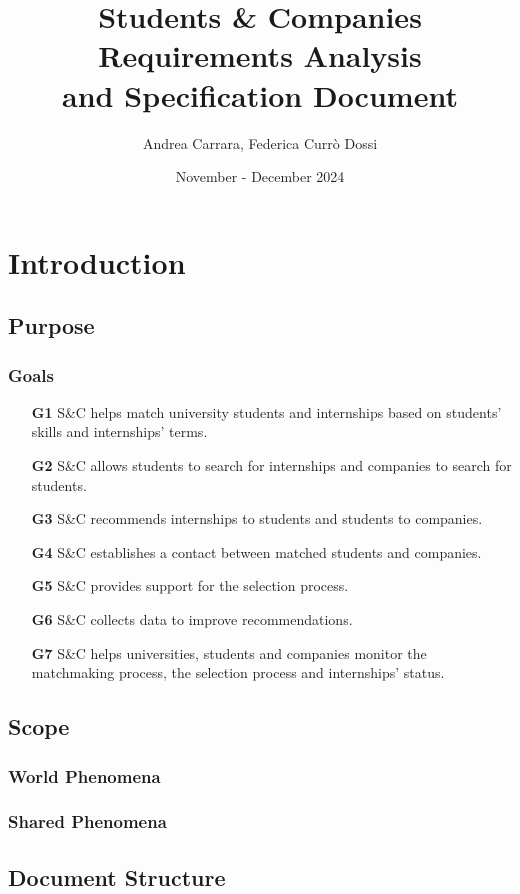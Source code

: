 \documentclass[a4paper, oneside]{book}
\title{
  Students \& Companies \\
  \Huge Requirements Analysis \\
  and Specification Document
}
\author{Andrea Carrara, Federica Currò Dossi}
\date{November - December 2024}
\begin{document}
\maketitle

\tableofcontents

\chapter{Introduction}
\section{Purpose}
\subsection{Goals}

\begin{itemize}
    \item [\textbf{G1}] S\&C helps match university students and internships based on students' skills and internships' terms.
    \item [\textbf{G2}] S\&C allows students to search for internships and companies to search for students.
    \item [\textbf{G3}] S\&C recommends internships to students and students to companies.
    \item [\textbf{G4}] S\&C establishes a contact between matched students and companies.
    \item [\textbf{G5}] S\&C provides support for the selection process.
    \item [\textbf{G6}] S\&C collects data to improve recommendations.
    \item [\textbf{G7}] S\&C helps universities, students and companies monitor the matchmaking process, the selection process and internships' status.
\end{itemize}

\section{Scope}
\subsection{World Phenomena}
\subsection{Shared Phenomena}
\section{Document Structure}
\end{document}
